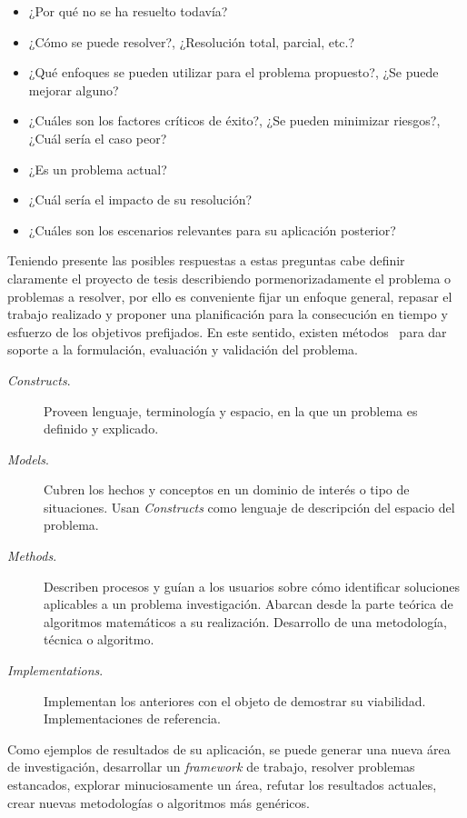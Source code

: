 \begin{itemize}
    \item ¿Por qué no se ha resuelto todavía?
    \item ¿Cómo se puede resolver?, ¿Resolución total, parcial, etc.?
    \item ¿Qué enfoques se pueden utilizar para el problema propuesto?, ¿Se puede mejorar alguno?
    \item ¿Cuáles son los factores críticos de éxito?, ¿Se pueden minimizar riesgos?, ¿Cuál sería el caso peor?
    \item ¿Es un problema actual?
    \item ¿Cuál sería el impacto de su resolución?
    \item ¿Cuáles son los escenarios relevantes para su aplicación posterior? 
\end{itemize}

Teniendo presente las posibles respuestas a estas preguntas cabe definir claramente el proyecto de tesis describiendo pormenorizadamente
el problema o problemas a resolver, por ello es conveniente fijar un enfoque general, repasar el trabajo realizado y proponer
una planificación para la consecución en tiempo y esfuerzo de los objetivos prefijados. En este sentido, existen 
métodos~\cite{Hevner:2010:DRI:1859261} para dar soporte a la formulación, evaluación y validación del problema.

\begin{description}
 \item [\textit{Constructs}.] Proveen lenguaje, terminología y espacio, en la que un problema es definido y explicado.
 \item [\textit{Models}.] Cubren los hechos y conceptos en un dominio de interés o tipo de situaciones. Usan \textit{Constructs} 
  como lenguaje de descripción del espacio del problema.
 \item [\textit{Methods}.] Describen procesos y guían a los usuarios sobre cómo identificar soluciones aplicables a un problema investigación. 
  Abarcan desde la parte teórica de algoritmos matemáticos a su realización. Desarrollo de una metodología, técnica o algoritmo.
 \item [\textit{Implementations}.] Implementan los anteriores con el objeto de demostrar su viabilidad. Implementaciones de referencia.
\end{description}

Como ejemplos de resultados de su aplicación, se puede generar una nueva área de investigación, desarrollar un \textit{framework} de trabajo, 
resolver problemas estancados, explorar minuciosamente un área, refutar los resultados actuales, crear nuevas metodologías o 
algoritmos más genéricos. 


